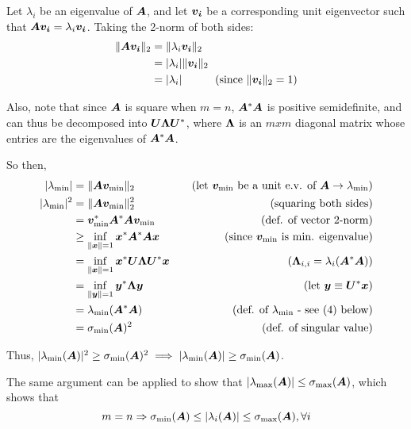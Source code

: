 \documentclass[twoside,10pt]{article}
\begin{document}
  Let $\lambda_i$ be an eigenvalue of $\bm{A}$, and let $\bm{v_i}$ be a corresponding unit eigenvector such that $\bm{A}\bm{v_i} = \lambda_i\bm{v_i}$. 
  Taking the 2-norm of both sides:
  \begin{align*}
    \|\bm{A}\bm{v_i}\|_2 &= \|\lambda_i \bm{v_i}\|_2\\
    &= |\lambda_i| \|\bm{v_i}\|_2\\
    &= |\lambda_i|\quad\quad\quad\text{(since $\|\bm{v_i}\|_2 = 1$)}
  \end{align*}

  Also, note that since $\bm{A}$ is square when $m = n$, $\bm{A}^{*}\bm{A}$ is positive semidefinite, and can thus be decomposed into $\bm{U}\bm{\Lambda}\bm{U}^{*}$, where $\bm{\Lambda}$ is an $mxm$ diagonal matrix whose entries are the eigenvalues of $\bm{A}^{*}\bm{A}$.

  So then,
  \begin{align*}
    |\lambda_{\mathrm{min}}| &= \|\bm{A}\bm{v}_{\mathrm{min}}\|_2&\quad\text{(let $\bm{v}_{\mathrm{min}}$ be a unit e.v. of $\bm{A} \to \lambda_{\mathrm{min}}$)}\\
    |\lambda_{\mathrm{min}}|^2 &= \|\bm{A}\bm{v}_{\mathrm{min}}\|_2^2&\quad\text{(squaring both sides)}\\
    &= \bm{v}_{\mathrm{min}}^{*}\bm{A}^{*}\bm{A}\bm{v}_{\mathrm{min}}&\quad\text{(def. of vector 2-norm)}\\
    &\geq \inf_{\|\bm{x}\| = 1}{\bm{x}^{*}\bm{A}^{*}\bm{A}\bm{x}}&\quad\text{(since $\bm{v}_{\mathrm{min}}$ is min. eigenvalue)}\\
    &= \inf_{\|\bm{x}\| = 1}{\bm{x}^{*}\bm{U}\bm{\Lambda}\bm{U}^{*}\bm{x}}&\quad\text{($\bm{\Lambda}_{i,i} = \lambda_i(\bm{A}^{*}\bm{A})$)}\\
    &= \inf_{\|\bm{y}\| = 1}{\bm{y}^{*}\bm{\Lambda}\bm{y}}&\quad\text{(let $\bm{y} \equiv \bm{U}^{*}\bm{x}$)}\\
    &= \lambda_{\mathrm{min}}(\bm{A}^{*}\bm{A})&\quad\text{(def. of $\lambda_{\mathrm{min}}$ - see (4) below)}\\
    &= \sigma_{\mathrm{min}}(\bm{A})^2&\quad\text{(def. of singular value)}\\
  \end{align*}

  Thus, $|\lambda_{\mathrm{min}}(\bm{A})|^2 \geq \sigma_{\mathrm{min}}(\bm{A})^2 \implies |\lambda_{\mathrm{min}}(\bm{A})| \geq \sigma_{\mathrm{min}}(\bm{A})$.

  The same argument can be applied to show that $|\lambda_{\mathrm{max}}(\bm{A})| \leq \sigma_{\mathrm{max}}(\bm{A})$, which shows that
  \begin{equation*}
    m = n \Rightarrow \sigma_{\mathrm{min}}(\mtx{A}) \leq \left|\lambda_{i}\left(\mtx{A}\right)\right| \leq \sigma_{\mathrm{max}}\left(\mtx{A}\right), \forall i 
  \end{equation*}
\end{document}
